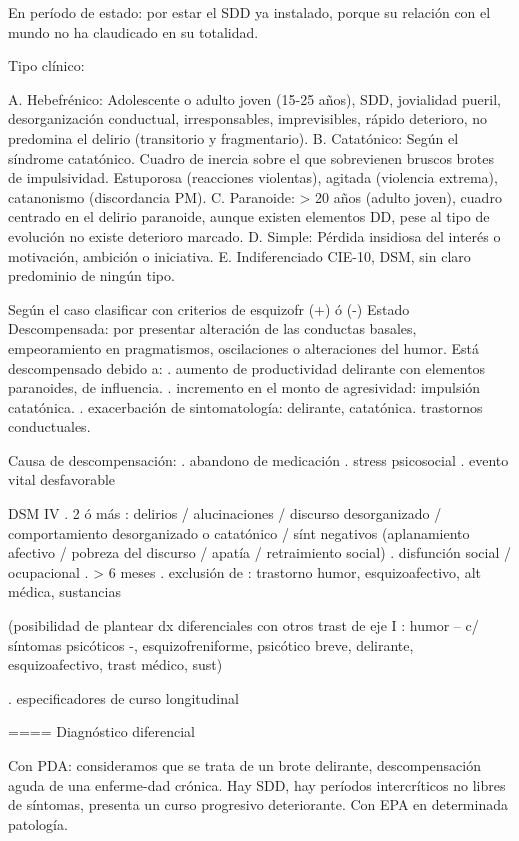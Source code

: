 En período de estado: por estar el SDD ya instalado, porque su relación con el mundo no ha claudicado en su totalidad. 

Tipo clínico: 

A. Hebefrénico: Adolescente o adulto joven (15-25 años), SDD, jovialidad pueril, desorganización conductual, irresponsables, imprevisibles, rápido deterioro, no predomina el delirio (transitorio y fragmentario). 
B. Catatónico: Según el síndrome catatónico. Cuadro de inercia sobre el que sobrevienen bruscos brotes de impulsividad. Estuporosa (reacciones violentas), agitada (violencia extrema), catanonismo (discordancia PM). 
C. Paranoide: > 20 años (adulto joven), cuadro centrado en el delirio paranoide, aunque existen elementos DD, pese al tipo de evolución no existe deterioro marcado. 
D. Simple: Pérdida insidiosa del interés o motivación, ambición o iniciativa. 
E. Indiferenciado CIE-10, DSM, sin claro predominio de ningún tipo.

Según el caso clasificar con criterios de esquizofr (+) ó (-) Estado Descompensada: por presentar alteración de las conductas basales, empeoramiento en pragmatismos, oscilaciones o alteraciones del humor. Está descompensado debido a: . aumento de productividad delirante con elementos paranoides, de influencia. . incremento en el monto de agresividad: impulsión catatónica. . exacerbación de sintomatología: delirante, catatónica. trastornos conductuales.

Causa de descompensación: 
. abandono de medicación
. stress psicosocial
. evento vital desfavorable 

DSM IV
. 2 ó más : delirios / alucinaciones / discurso desorganizado / comportamiento desorganizado o catatónico / sínt negativos (aplanamiento afectivo / pobreza del discurso / apatía / retraimiento social)
. disfunción social / ocupacional
. > 6 meses
. exclusión de : trastorno humor, esquizoafectivo, alt médica, sustancias

(posibilidad de plantear dx diferenciales con otros trast de eje I : humor – c/ síntomas psicóticos -, esquizofreniforme, psicótico breve, delirante, esquizoafectivo, trast médico, sust)

. especificadores de curso longitudinal

==== Diagnóstico diferencial

Con PDA: consideramos que se trata de un brote delirante, descompensación aguda de una enferme-dad crónica. Hay SDD, hay períodos intercríticos no libres de síntomas, presenta un curso progresivo deteriorante. Con EPA en determinada patología.

